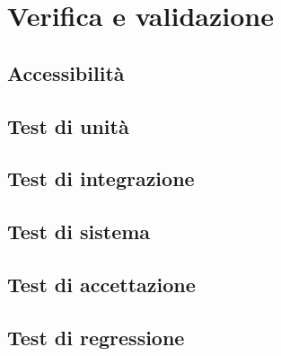 \chapter{Verifica e validazione}
\label{cap:verifica-validazione}

\section{Accessibilità}\label{sec:verifica-validazione-accessibilita}

\section{Test di unità}\label{sec:verifica-validazione-test}

\section{Test di integrazione}\label{sec:verifica-validazione-integrazione}

\section{Test di sistema}\label{sec:verifica-validazione-sistema}

\section{Test di accettazione}\label{sec:verifica-validazione-accettazione}

\section{Test di regressione}\label{sec:verifica-validazione-regressione}